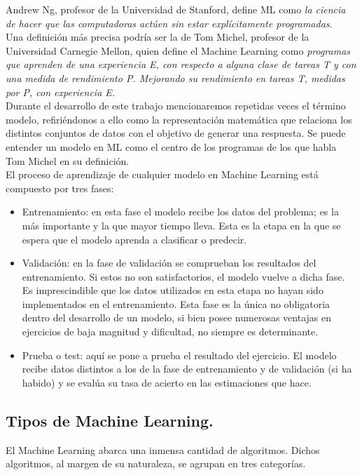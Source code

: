 \documentclass[a4paper,11pt]{article}
\begin{document}
\noindent
Andrew Ng, profesor de la Universidad de Stanford, define ML como \textit{la ciencia de hacer que las computadoras actúen sin estar explícitamente programadas}.\\

\noindent
Una definición más precisa podría ser la de Tom Michel, profesor de la Universidad Carnegie Mellon, quien define el Machine Learning como \textit{programas que aprenden de una experiencia E, con respecto a alguna clase de tareas T y con una medida de rendimiento P. Mejorando su rendimiento en tareas T, medidas por P, con experiencia E.}\\

\noindent
Durante el desarrollo de este trabajo mencionaremos repetidas veces el término modelo, refiriéndonos a ello como la representación matemática que relaciona los distintos conjuntos de datos con el objetivo de generar una respuesta. Se puede entender un modelo en ML como el centro de los programas de los que habla Tom Michel en su definición.\\

\noindent
El proceso de aprendizaje de cualquier modelo en Machine Learning está compuesto por tres fases:
\begin{itemize}
\item Entrenamiento: en esta fase el modelo recibe los datos del problema; es la más importante y la que mayor tiempo lleva. Esta es la etapa en la que se espera que el modelo aprenda a clasificar o predecir.
\item Validación: en la fase de validación se comprueban los resultados del entrenamiento. Si estos no son satisfactorios, el modelo vuelve a dicha fase. Es imprescindible que los datos utilizados en esta etapa no hayan sido implementados en el entrenamiento. Esta fase es la única no obligatoria dentro del desarrollo de un modelo, si bien posee numerosas ventajas en ejercicios de baja magnitud y dificultad, no siempre es determinante.
\item Prueba o test: aquí se pone a prueba el resultado del ejercicio. El modelo recibe datos distintos a los de la fase de entrenamiento y de validación (si ha habido) y se evalúa su tasa de acierto en las estimaciones que hace.
\end{itemize}

\subsection{Tipos de Machine Learning.}
El Machine Learning abarca una inmensa cantidad de algoritmos. Dichos algoritmos, al margen de su naturaleza, se agrupan en tres categorías.
\end{document}

